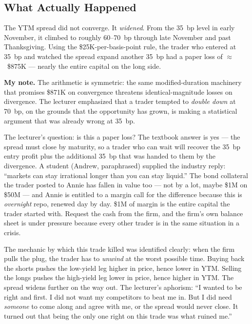 \subsection{What Actually Happened}\label{L3-sec:case-what-happened}

The YTM spread did not converge. It \emph{widened}. From the 35~bp level in
early November, it climbed to roughly 60--70~bp through late November and
past Thanksgiving. Using the \$25K-per-basis-point rule, the trader who
entered at 35~bp and watched the spread expand another 35~bp had a paper
loss of $\approx$~\$875K --- nearly the entire capital on the long side.

\begin{checkpoint}
\textbf{My note.} The arithmetic is symmetric: the same modified-duration
machinery that promises \$871K on convergence threatens identical-magnitude
losses on divergence. The lecturer emphasized that a trader tempted to
\emph{double down} at 70~bp, on the grounds that the opportunity has grown,
is making a statistical argument that was already wrong at 35~bp.
\end{checkpoint}

The lecturer's question: is this a paper loss? The textbook answer is yes
--- the spread must close by maturity, so a trader who can wait will
recover the 35~bp entry profit plus the additional 35~bp that was handed to
them by the divergence. A student (Andrew, paraphrased) supplied the
industry reply: ``markets can stay irrational longer than you can stay
liquid.'' The bond collateral the trader posted to Annie has fallen in
value too --- not by a lot, maybe \$1M on \$50M --- and Annie is entitled to
a margin call for the difference because this is \emph{overnight} repo,
renewed day by day. \$1M of margin is the entire capital the trader started
with. Request the cash from the firm, and the firm's own balance sheet is
under pressure because every other trader is in the same situation in a
crisis.

The mechanic by which this trade killed was identified clearly: when the
firm pulls the plug, the trader has to \emph{unwind} at the worst possible
time. Buying back the shorts pushes the low-yield leg higher in price,
hence lower in YTM. Selling the longs pushes the high-yield leg lower in
price, hence higher in YTM. The spread widens further on the way out.
The lecturer's aphorism: ``I wanted to be right and first. I did not want
my competitors to beat me in. But I did need \emph{someone} to come along
and agree with me, or the spread would never close. It turned out that
being the only one right on this trade was what ruined me.''

